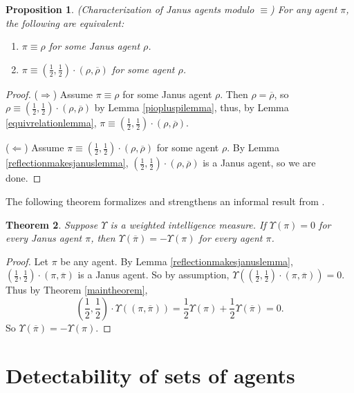 \documentclass[twoside]{article}
\newtheorem{theorem}{Theorem}
\newtheorem{proposition}[theorem]{Proposition}
\begin{document}
\begin{proposition}
    (Characterization of Janus agents modulo $\equiv$)
    For any agent $\pi$, the following are equivalent:
    \begin{enumerate}
        \item $\pi\equiv\rho$ for some Janus agent $\rho$.
        \item $\pi\equiv(\frac12,\frac12)\cdot(\rho,\overline{\rho})$
            for some agent $\rho$.
    \end{enumerate}
\end{proposition}

\begin{proof}
    ($\Rightarrow$)
    Assume $\pi\equiv\rho$ for some Janus agent $\rho$.
    Then $\rho=\overline{\rho}$, so
    $\rho\equiv (\frac12,\frac12)\cdot(\rho,\overline{\rho})$ by
    Lemma \ref{piopluspilemma}, thus, by Lemma \ref{equivrelationlemma},
    $\pi\equiv(\frac12,\frac12)\cdot(\rho,\overline{\rho})$.

    ($\Leftarrow$)
    Assume $\pi\equiv(\frac12,\frac12)\cdot(\rho,\overline{\rho})$ for some agent $\rho$.
    By Lemma \ref{reflectionmakesjanuslemma},
    $(\frac12,\frac12)\cdot(\rho,\overline{\rho})$ is a Janus agent, so we are done.
\end{proof}

The following theorem formalizes and strengthens an informal result
from \cite{alexander2021reward}.

\begin{theorem}
    Suppose $\Upsilon$ is a weighted intelligence measure.
    If $\Upsilon(\pi)=0$ for every Janus agent $\pi$,
    then $\Upsilon(\overline{\pi})=-\Upsilon(\pi)$
    for every agent $\pi$.
\end{theorem}

\begin{proof}
    Let $\pi$ be any agent.
    By Lemma \ref{reflectionmakesjanuslemma},
    $(\frac12,\frac12)\cdot(\pi,\overline\pi)$ is a Janus agent.
    So by assumption,
    $\Upsilon((\frac12,\frac12)\cdot(\pi,\overline\pi))=0$.
    Thus by Theorem \ref{maintheorem},
    \[
        (\mbox{$\frac12$},\mbox{$\frac12$})\cdot\Upsilon((\pi,\overline\pi))
        =\mbox{$\frac12$}\Upsilon(\pi)+\mbox{$\frac12$}\Upsilon(\overline\pi)=0.
    \]
    So $\Upsilon(\overline{\pi})=-\Upsilon(\pi)$.
\end{proof}


\section{Detectability of sets of agents}
\end{document}
